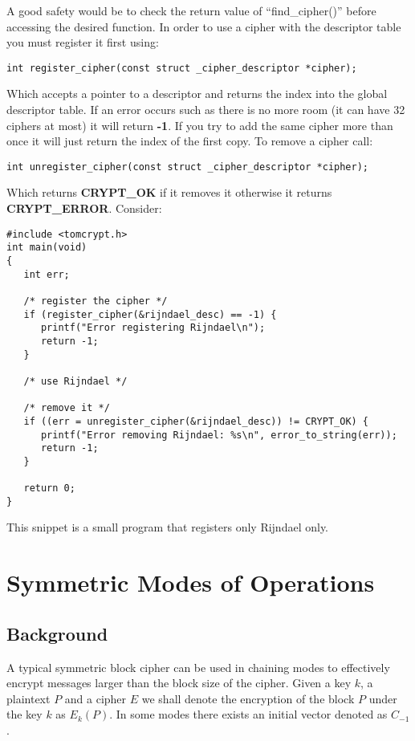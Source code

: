 \documentclass[a4paper]{book}
\begin{document}
A good safety would be to check the return value of ``find\_cipher()'' before accessing the desired function.  In order
to use a cipher with the descriptor table you must register it first using:
\begin{verbatim}
int register_cipher(const struct _cipher_descriptor *cipher);
\end{verbatim}
Which accepts a pointer to a descriptor and returns the index into the global descriptor table.  If an error occurs such
as there is no more room (it can have 32 ciphers at most) it will return {\bf{-1}}.  If you try to add the same cipher more
than once it will just return the index of the first copy.  To remove a cipher call:
\begin{verbatim}
int unregister_cipher(const struct _cipher_descriptor *cipher);
\end{verbatim}
Which returns {\bf CRYPT\_OK} if it removes it otherwise it returns {\bf CRYPT\_ERROR}.  Consider:
\begin{small}
\begin{verbatim}
#include <tomcrypt.h>
int main(void)
{
   int err;
   
   /* register the cipher */
   if (register_cipher(&rijndael_desc) == -1) {
      printf("Error registering Rijndael\n");
      return -1;
   }

   /* use Rijndael */

   /* remove it */
   if ((err = unregister_cipher(&rijndael_desc)) != CRYPT_OK) {
      printf("Error removing Rijndael: %s\n", error_to_string(err));
      return -1;
   }

   return 0;
}
\end{verbatim}
\end{small}
This snippet is a small program that registers only Rijndael only.  

\section{Symmetric Modes of Operations}
\subsection{Background}
A typical symmetric block cipher can be used in chaining modes to effectively encrypt messages larger than the block
size of the cipher.  Given a key $k$, a plaintext $P$ and a cipher $E$ we shall denote the encryption of the block
$P$ under the key $k$ as $E_k(P)$.  In some modes there exists an initial vector denoted as $C_{-1}$.
\end{document}
